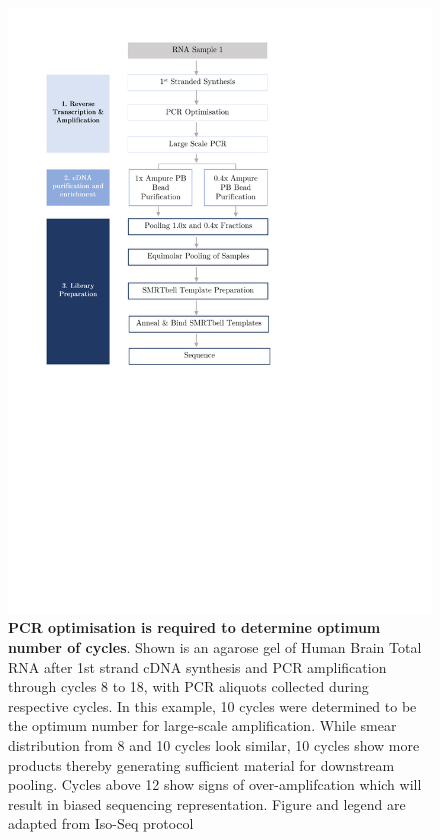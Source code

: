 \begin{figure}[htp]
	\begin{center}
		\includegraphics[page=13,trim={1cm 24cm 10cm 1cm},clip,scale = 0.9]{Figures/ProjectDevelopment_Figures.pdf}
	\end{center}
	\captionsetup{width=0.95\textwidth}
	\caption[Example of Agarose gel to determine optimum number of PCR cycles for amplification]%
	{\textbf{PCR optimisation is required to determine optimum number of cycles}. Shown is an agarose gel of Human Brain Total RNA after 1st strand cDNA synthesis and PCR amplification through cycles 8 to 18, with PCR aliquots collected during respective cycles. In this example, 10 cycles were determined to be the optimum number for large-scale amplification. While smear distribution from 8 and 10 cycles look similar, 10 cycles show more products thereby generating sufficient material for downstream pooling. Cycles above 12 show signs of over-amplifcation which will result in biased sequencing representation. Figure and legend are adapted from Iso-Seq protocol}
	\label{fig:pcr_optimisation_gel_eg}
\end{figure}


